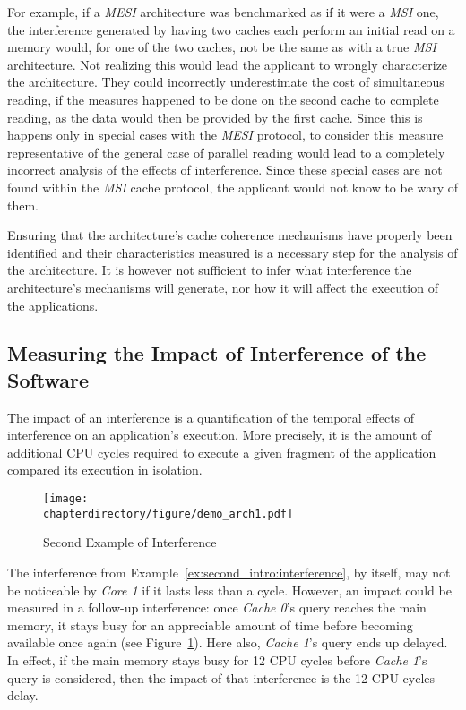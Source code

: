 For example, if a \textit{MESI} architecture was benchmarked as if it were a
\textit{MSI} one, the interference generated by having two caches each perform
an initial read on a memory would, for one of the two caches, not be the same as
with a true \textit{MSI} architecture. Not realizing this would lead the
applicant to wrongly characterize the architecture. They could incorrectly
underestimate the cost of simultaneous reading, if the measures happened to be
done on the second cache to complete reading, as the data would then be provided
by the first cache. Since this is happens only in special cases with the
\textit{MESI} protocol, to consider this measure representative of the general
case of parallel reading would lead to a completely incorrect analysis of the
effects of interference. Since these special cases are not found within the
\textit{MSI} cache protocol, the applicant would not know to be wary of them.

Ensuring that the architecture's cache coherence mechanisms have properly been
identified and their characteristics measured is a necessary step for the
analysis of the architecture. It is however not sufficient to infer what
interference the architecture's mechanisms will generate, nor how it will
affect the execution of the applications.

\subsection{Measuring the Impact of Interference of the Software}
\begin{definition}
\label{sec:impact_of_interference}
The impact of an interference is a quantification of the temporal effects of
interference on an application's execution. More precisely, it is the amount of
additional CPU cycles required to execute a given fragment of the application
compared its execution in isolation.
\end{definition}

\begin{figure}[hbt!]
\begin{center}
\texttt{[image: \\chapterdirectory/figure/demo\_arch1.pdf]}
\end{center}
\caption{Second Example of Interference}
\label{fig:second_intro:interference_example2}
\end{figure}

\begin{example}
The interference from Example~\ref{ex:second_intro:interference}, by itself, may
not be noticeable by \textit{Core 1} if it lasts less than a cycle. However, an
impact could be measured in a follow-up interference: once \textit{Cache 0}'s
query reaches the main memory, it stays busy for an appreciable amount of time
before becoming available once again (see
Figure~\ref{fig:second_intro:interference_example2}). Here also, \textit{Cache
1}'s query ends up delayed. In effect, if the main memory stays busy for 12 CPU
cycles before \textit{Cache 1}'s query is considered, then the impact of that
interference is the 12 CPU cycles delay.
\end{example}

